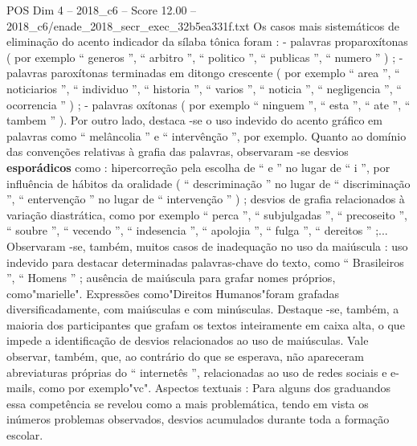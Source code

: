 \begin{textsample}{POS Dim 4 – 2018\_c6 – Score 12.00 – 2018\_c6/enade\_2018\_secr\_exec\_32b5ea331f.txt}
Os casos mais sistemáticos de eliminação do acento indicador da sílaba tônica foram : - palavras proparoxítonas ( por exemplo “ generos ”, “ arbitro ”, “ politico ”, “ publicas ”, “ numero ” ) ; - palavras paroxítonas terminadas em ditongo crescente ( por exemplo “ area ”, “ noticiarios ”, “ individuo ”, “ historia ”, “ varios ”, “ noticia ”, “ negligencia ”, “ ocorrencia ” ) ; - palavras oxítonas ( por exemplo “ ninguem ”, “ esta ”, “ ate ”, “ tambem ” ).
Por outro lado, destaca -se o uso indevido do acento gráfico em palavras como “ melâncolia ” e “ intervênção ”, por exemplo.
Quanto ao domínio das convenções relativas à grafia das palavras, observaram -se desvios \textbf{esporádicos} como : hipercorreção pela escolha de “ e ” no lugar de “ i ”, por influência de hábitos da oralidade ( “ descriminação ” no lugar de “ discriminação ”, “ entervenção ” no lugar de “ intervenção ” ) ; desvios de grafia relacionados à variação diastrática, como por exemplo “ perca ”, “ subjulgadas ”, “ precoseito ”, “ soubre ”, “ vecendo ”, “ indesencia ”, “ apolojia ”, “ fulga ”, “ dereitos ” ;...
Observaram -se, também, muitos casos de inadequação no uso da maiúscula : uso indevido para destacar determinadas palavras-chave do texto, como “ Brasileiros ”, “ Homens ” ; ausência de maiúscula para grafar nomes próprios, como"marielle".
Expressões como"Direitos Humanos"foram grafadas diversificadamente, com maiúsculas e com minúsculas.
Destaque -se, também, a maioria dos participantes que grafam os textos inteiramente em caixa alta, o que impede a identificação de desvios relacionados ao uso de maiúsculas.
Vale observar, também, que, ao contrário do que se esperava, não apareceram abreviaturas próprias do “ internetês ”, relacionadas ao uso de redes sociais e e-mails, como por exemplo"vc".
Aspectos textuais : Para alguns dos graduandos essa competência se revelou como a mais problemática, tendo em vista os inúmeros problemas observados, desvios acumulados durante toda a formação escolar.

\end{textsample}
